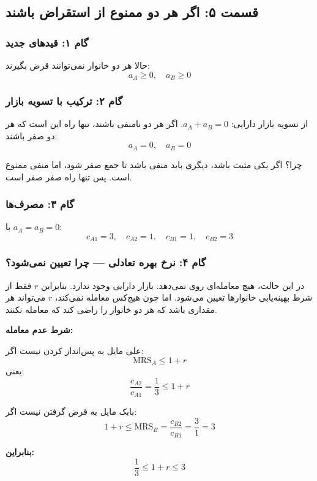 \documentclass[12pt,a4paper]{article}
\newcommand{\MRS}{\mathrm{MRS}}
\begin{document}
\subsection{قسمت ۵: اگر هر دو ممنوع از استقراض باشند}

\subsubsection{گام ۱: قیدهای جدید}

حالا هر دو خانوار نمی‌توانند قرض بگیرند:
\[
	a_A \geq 0, \quad a_B \geq 0
\]

\subsubsection{گام ۲: ترکیب با تسویه بازار}

از تسویه بازار دارایی: $a_A + a_B = 0$. اگر هر دو نامنفی باشند، تنها راه این است که هر دو صفر باشند:
\[
	a_A = 0, \quad a_B = 0
\]

چرا؟ اگر یکی مثبت باشد، دیگری باید منفی باشد تا جمع صفر شود، اما منفی ممنوع است. پس تنها راه صفر صفر است.

\subsubsection{گام ۳: مصرف‌ها}

با $a_A = a_B = 0$:
\[
	c_{A1} = 3, \quad c_{A2} = 1, \quad c_{B1} = 1, \quad c_{B2} = 3
\]

\subsubsection{گام ۴: نرخ بهره تعادلی — چرا تعیین نمی‌شود؟}

در این حالت، هیچ معامله‌ای روی نمی‌دهد. بازار دارایی وجود ندارد. بنابراین $r$ فقط از شرط بهینه‌یابی خانوارها تعیین می‌شود. اما چون هیچ‌کس معامله نمی‌کند، $r$ می‌تواند هر مقداری باشد که هر دو خانوار را راضی کند که معامله نکنند.

\textbf{شرط عدم معامله:}

علی مایل به پس‌انداز کردن نیست اگر:
\[
	\MRS_A \leq 1+r
\]
یعنی:
\[
	\frac{c_{A2}}{c_{A1}} = \frac{1}{3} \leq 1+r
\]

بابک مایل به قرض گرفتن نیست اگر:
\[
	1+r \leq \MRS_B = \frac{c_{B2}}{c_{B1}} = \frac{3}{1} = 3
\]

\textbf{بنابراین:}
\[
	\frac{1}{3} \leq 1+r \leq 3
\]
\end{document}
